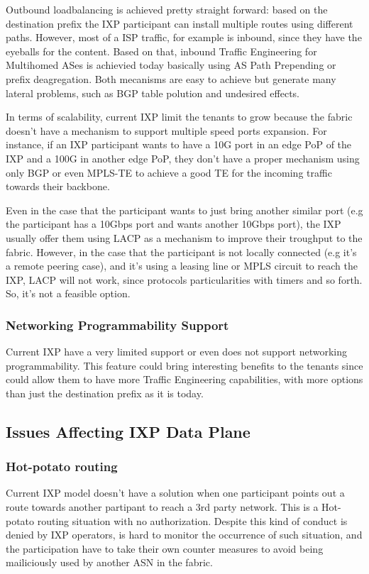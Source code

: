 Outbound loadbalancing is achieved pretty straight forward: based on the destination prefix the IXP participant can install multiple routes using different paths. However, most of a ISP traffic, for example is inbound, since they have the eyeballs for the content. Based on that, inbound Traffic Engineering for Multihomed ASes is achievied today basically using AS Path Prepending or prefix deagregation. Both mecanisms are easy to achieve but generate many lateral problems, such as BGP table polution and undesired effects.

In terms of scalability, current IXP limit the tenants to grow because the fabric doesn't have a mechanism to support multiple speed ports expansion. For instance, if an IXP participant wants to have a 10G port in an edge PoP of the IXP and a 100G in another edge PoP, they don't have a proper mechanism using only BGP or even MPLS-TE to achieve a good TE for the incoming traffic towards their backbone.

Even in the case that the participant wants to just bring another similar port (e.g the participant has a 10Gbps port and wants another 10Gbps port), the IXP usually offer them using LACP as a mechanism to improve their troughput to the fabric. However, in the case that the participant is not locally connected (e.g it's a remote peering case), and it's using a leasing line or MPLS circuit to reach the IXP, LACP will not work, since protocols particularities with timers and so forth. So, it's not a feasible option.

\subsubsection{Networking Programmability Support}
Current IXP have a very limited support or even does not support networking programmability. This feature could bring interesting benefits to the tenants since could allow them to have more Traffic Engineering capabilities, with more options than just the destination prefix as it is today. 

\subsection{Issues Affecting IXP Data Plane}
\subsubsection{Hot-potato routing}
Current IXP model doesn't have a solution when one participant points out a route towards another partipant to reach a 3rd party network. This is a Hot-potato routing situation with no authorization. Despite this kind of conduct is denied by IXP operators, is hard to monitor the occurrence of such situation, and the participation have to take their own counter measures to avoid being mailiciously used by another ASN in the fabric.

